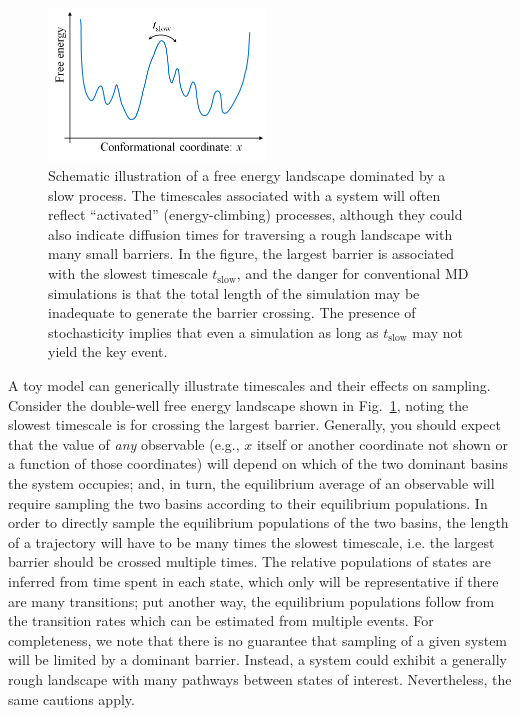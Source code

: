 \begin{figure}
  \centering
  \includegraphics[width=5.8cm]{figures/1d-landscape-tslow}
  \caption{
  \label{fig:landscape} 
  Schematic illustration of a free energy landscape dominated by a slow process.
  The timescales associated with a system will often reflect ``activated'' (energy-climbing) processes, although they could also indicate diffusion times for traversing a rough landscape with many small barriers.
  In the figure, the largest barrier is associated with the slowest timescale $t_{\mathrm{slow}}$, and the danger for conventional MD simulations is that the total length of the simulation may be inadequate to generate the barrier crossing.
  The presence of stochasticity implies that even a simulation as long as $t_{\mathrm{slow}}$ may not yield the key event.
  }
\end{figure}

A toy model can generically illustrate timescales and their effects on sampling.
Consider the double-well free energy landscape shown in Fig.\ \ref{fig:landscape}, noting the slowest timescale is for crossing the largest barrier.
Generally, you should expect that the value of \emph{any} observable (e.g., $x$ itself or another coordinate not shown or a function of those coordinates) will depend on which of the two dominant basins the system occupies; and, in turn, the equilibrium average of an observable will require sampling the two basins according to their equilibrium populations.
In order to directly sample the equilibrium populations of the two basins, the length of a trajectory will have to be many times the slowest timescale, i.e. the largest barrier should be crossed multiple times.
The relative populations of states are inferred from time spent in each state, which only will be representative if there are many transitions;
put another way, the equilibrium populations follow from the transition rates \cite{Zuckerman2011} which can be estimated from multiple events.
For completeness, we note that there is no guarantee that sampling of a given system will be limited by a dominant barrier.  
Instead, a system could exhibit a generally rough landscape with many pathways between states of interest.
Nevertheless, the same cautions apply.

